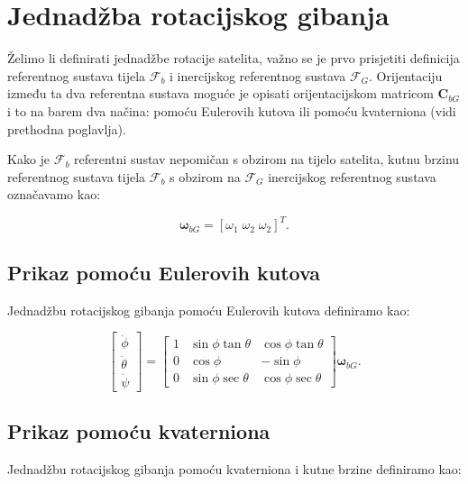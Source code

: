 \documentclass[times, utf8, diplomski, numeric]{templates/template}
\begin{document}
{    \section{Jednadžba rotacijskog gibanja}{
        Želimo li definirati jednadžbe rotacije satelita, važno se je prvo prisjetiti definicija referentnog sustava tijela $\mathcal{F}_b$ i inercijskog referentnog sustava $\mathcal{F}_G$. Orijentaciju između ta dva referentna sustava moguće je opisati orijentacijskom matricom $\boldsymbol{C}_{bG}$ i to na barem dva načina: pomoću Eulerovih kutova ili pomoću kvaterniona (vidi prethodna poglavlja).

        Kako je $\mathcal{F}_b$ referentni sustav nepomičan s obzirom na tijelo satelita, kutnu brzinu referentnog sustava tijela $\mathcal{F}_b$ s obzirom na $\mathcal{F}_G$ inercijskog referentnog sustava označavamo kao:

        \begin{equation}
            \boldsymbol{\omega}_{bG} = \left[ \omega_1 \; \omega_2 \; \omega_2\right]^T.
        \end{equation}

        \subsection{Prikaz pomoću Eulerovih kutova}{
            Jednadžbu rotacijskog gibanja pomoću Eulerovih kutova definiramo kao:

            \begin{equation}
                \begin{bmatrix}
                    \dot{\phi} \\
                    \dot{\theta} \\
                    \dot{\psi}
                \end{bmatrix}
                =
                \begin{bmatrix}
                    1 & \sin\phi\tan\theta & \cos\phi\tan\theta \\
                    0 & \cos\phi & -\sin\phi \\
                    0 & \sin\phi\sec\theta & \cos\phi\sec\theta
                \end{bmatrix}
                \boldsymbol{\omega}_{bG}.
            \end{equation}
        }

        \subsection{Prikaz pomoću kvaterniona}{
            Jednadžbu rotacijskog gibanja pomoću kvaterniona i kutne brzine definiramo kao:

}}}
\end{document}
